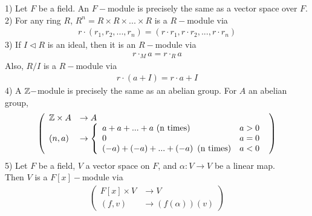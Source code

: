 \documentclass[a4paper]{article}
\begin{document}
\begin{eg}
1) Let $F$ be a field. An $F-$module is precisely the same as a vector space over $F$.\\
2) For any ring $R$, $R^n = R\times R\times ... \times R$ is a $R-$module via
\begin{equation*}
\begin{aligned}
r\cdot\left(r_1,r_2,...,r_n\right) = \left(r\cdot r_1,r\cdot r_2,...,r\cdot r_n\right)
\end{aligned}
\end{equation*}
3) If $I\triangleleft R$ is an ideal, then it is an $R-$module via
\begin{equation*}
\begin{aligned}
r\cdot_M a = r\cdot_R a
\end{aligned}
\end{equation*}
Also, $R/I$ is a $R-$module via
\begin{equation*}
\begin{aligned}
r\cdot \left(a+I\right) = r\cdot a + I
\end{aligned}
\end{equation*}
4) A $\mathbb{Z}-$module is precisely the same as an abelian group. For $A$ an abelian group,
\begin{equation*}
\begin{aligned}
\left(
\begin{array}{ll}
\mathbb{Z} \times A &\to A\\
\left(n,a\right) &\to \left\{
\begin{array}{ll}
a+a+...+a \text{   (n times)} & a>0\\
0 & a=0\\
\left(-a\right)+\left(-a\right)+...+\left(-a\right) \text{    (n times)} & a<0
\end{array}
\right.
\end{array}
\right)
\end{aligned}
\end{equation*}
5) Let $F$ be a field, $V$ a vector space on $F$, and $\alpha: V\to V$ be a linear map.\\
Then $V$ is a $F[x]-$module via
\begin{equation*}
\begin{aligned}
\left(
\begin{array}{ll}
F[x]\times V &\to V\\
\left(f,v\right) &\to (f\left(\alpha\right))\left(v\right)
\end{array}
\right)
\end{aligned}

\end{equation*}
\end{eg}
\end{document}
